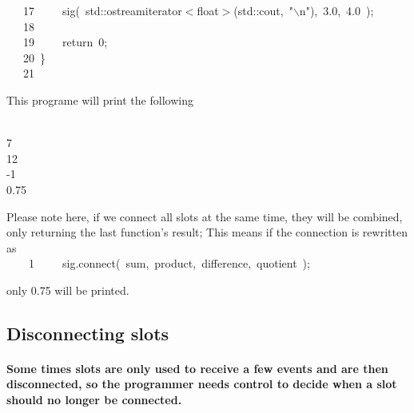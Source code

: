 \documentclass[9pt,onside,a4paper]{article}
\newcommand{\hlstd}[1]{\textcolor[rgb]{0.2,0,0.4}{#1}}
\newcommand{\hlnum}[1]{\textcolor[rgb]{0.2,0.73,0.02}{#1}}
\newcommand{\hlesc}[1]{\textcolor[rgb]{0.65,0.09,0.38}{#1}}
\newcommand{\hlstr}[1]{\textcolor[rgb]{0.09,0.38,0.65}{#1}}
\newcommand{\hlopt}[1]{\textcolor[rgb]{0.33,0.33,0.33}{#1}}
\newcommand{\hllin}[1]{\textcolor[rgb]{0.6,0.6,0.6}{#1}}
\newcommand{\hlkwa}[1]{\textcolor[rgb]{1,0.19,0.19}{#1}}
\newcommand{\hlkwb}[1]{\textcolor[rgb]{0.96,0.55,0.14}{#1}}
\newcommand{\hlkwd}[1]{\textcolor[rgb]{0.82,0.11,0.93}{#1}}
\begin{document}
\hllin{\ \ \ 17\ }\hlstd{}\hlstd{\ \ \ \ }\hlstd{}\hlkwd{sig}\hlstd{}\hlopt{(\ }\hlstd{std}\hlopt{::}\hlstd{ostream\textunderscore iterator}\hlopt{$<$}\hlstd{}\hlkwb{float}\hlstd{}\hlopt{$>$(}\hlstd{std}\hlopt{::}\hlstd{cout}\hlopt{,\ }\hlstd{}\hlstr{"}\hlesc{$\backslash$n}\hlstr{"}\hlstd{}\hlopt{),\ }\hlstd{}\hlnum{3.0}\hlstd{}\hlopt{,\ }\hlstd{}\hlnum{4.0\ }\hlstd{}\hlopt{);\ }\\
\hllin{\ \ \ 18\ }\hlstd{\\
\hllin{\ \ \ 19\ }}\hlstd{\ \ \ \ }\hlstd{}\hlkwa{return\ }\hlstd{}\hlnum{0}\hlstd{}\hlopt{;}\\
\hllin{\ \ \ 20\ }\hlstd{}\hlopt{\}}\\
\hllin{\ \ \ 21\ }\hlstd{}\\
\mbox{}
\normalfont
\normalsize

This programe will print the following  
\begin{shaded}
{\small
\ttfamily
~\\
7 \\
12 \\
-1 \\
0.75 
\normalfont
}
\end{shaded}

Please note here, if we connect all slots at the same time, they will be combined, only returning the last function's result; This means if the connection is rewritten as \\

\noindent
\ttfamily
\hlstd{\hllin{\ \ \ \ 1\ }}\hlstd{\ \ \ \ }\hlstd{sig}\hlopt{.}\hlstd{}\hlkwd{connect}\hlstd{}\hlopt{(\ }\hlstd{sum}\hlopt{,\ }\hlstd{product}\hlopt{,\ }\hlstd{difference}\hlopt{,\ }\hlstd{quotient\ }\hlopt{);}\\
\mbox{}
\normalfont
\normalsize

only \hlstd{0.75} will be printed.


\subsection{Disconnecting slots}

\paragraph{Some times slots are only used to receive a few events and are then disconnected, so the programmer needs control to decide when a slot should no longer be connected.\\}
\end{document}
